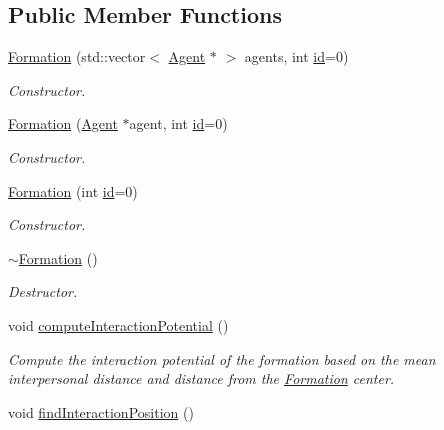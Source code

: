 \subsection*{Public Member Functions}
\begin{DoxyCompactItemize}
\item 
\hyperlink{classFormation_a5ec34c4941defd2b033f1f03bb42671f}{Formation} (std\+::vector$<$ \hyperlink{classAgent}{Agent} $\ast$ $>$ agents, int \hyperlink{classIdentifiedObject_ad044a317a9b573a3d1bcd025df166eb5}{id}=0)
\begin{DoxyCompactList}\small\item\em Constructor. \end{DoxyCompactList}\item 
\hyperlink{classFormation_a9c1013f55ac92dc20a81abc47c7849f2}{Formation} (\hyperlink{classAgent}{Agent} $\ast$agent, int \hyperlink{classIdentifiedObject_ad044a317a9b573a3d1bcd025df166eb5}{id}=0)
\begin{DoxyCompactList}\small\item\em Constructor. \end{DoxyCompactList}\item 
\hyperlink{classFormation_a7e1681f1a7b0e540f3c011179d5e8f12}{Formation} (int \hyperlink{classIdentifiedObject_ad044a317a9b573a3d1bcd025df166eb5}{id}=0)
\begin{DoxyCompactList}\small\item\em Constructor. \end{DoxyCompactList}\item 
\hyperlink{classFormation_a5b4ffd37549ec211d85e52c916f35eb6}{$\sim$\+Formation} ()
\begin{DoxyCompactList}\small\item\em Destructor. \end{DoxyCompactList}\item 
void \hyperlink{classFormation_aaa8469c44391f3255feca75d8d5d4ccc}{compute\+Interaction\+Potential} ()\hypertarget{classFormation_aaa8469c44391f3255feca75d8d5d4ccc}{}\label{classFormation_aaa8469c44391f3255feca75d8d5d4ccc}

\begin{DoxyCompactList}\small\item\em Compute the interaction potential of the formation based on the mean interpersonal distance and distance from the \hyperlink{classFormation}{Formation} center. \end{DoxyCompactList}\item 
void \hyperlink{classFormation_a5fd3207fbc27069771949e48c6fed283}{find\+Interaction\+Position} ()\hypertarget{classFormation_a5fd3207fbc27069771949e48c6fed283}{}\label{classFormation_a5fd3207fbc27069771949e48c6fed283}


\end{DoxyCompactItemize}
